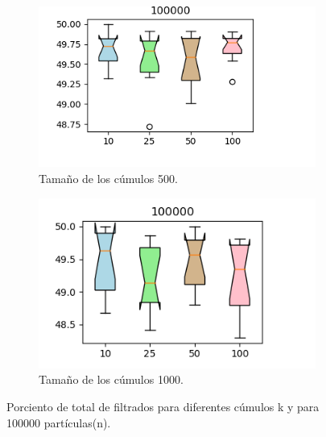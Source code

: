 \documentclass{article}
\begin{document}
\begin{figure}[H]
\begin{subfigure}[b]{0.45\linewidth}
		\label{2}
	\end{subfigure}
		\begin{subfigure}[b]{0.45\linewidth}
			\includegraphics[width=\linewidth]{c500.png}
			\caption{Tamaño de los cúmulos 500.}
			\label{3}
	\end{subfigure}
		\begin{subfigure}[b]{0.45\linewidth}
				\includegraphics[width=\linewidth]{c1000.png}
				\caption{Tamaño de los cúmulos 1000.}
				\label{4}
	\end{subfigure}
	\caption{Porciento de total de filtrados para diferentes cúmulos k y para 100000 partículas(n).}  		
\end{figure}
\end{document}
